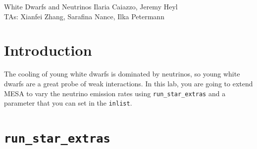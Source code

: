 \documentclass{article}
\begin{document}
\begin{titlebox}{White Dwarfs and Neutrinos}
Ilaria Caiazzo, Jeremy Heyl \\
TAs: Xianfei Zhang, Sarafina Nance, Ilka Petermann
\end{titlebox}

\section{Introduction}

The cooling of young white dwarfs is dominated by neutrinos, so young white dwarfs are a great probe of weak interactions.  In this lab, you are going to extend MESA to vary the neutrino emission rates using \texttt{run\_star\_extras} and a parameter that you can set in the \texttt{inlist}.

\section{\texttt{run\_star\_extras}}
\end{document}
